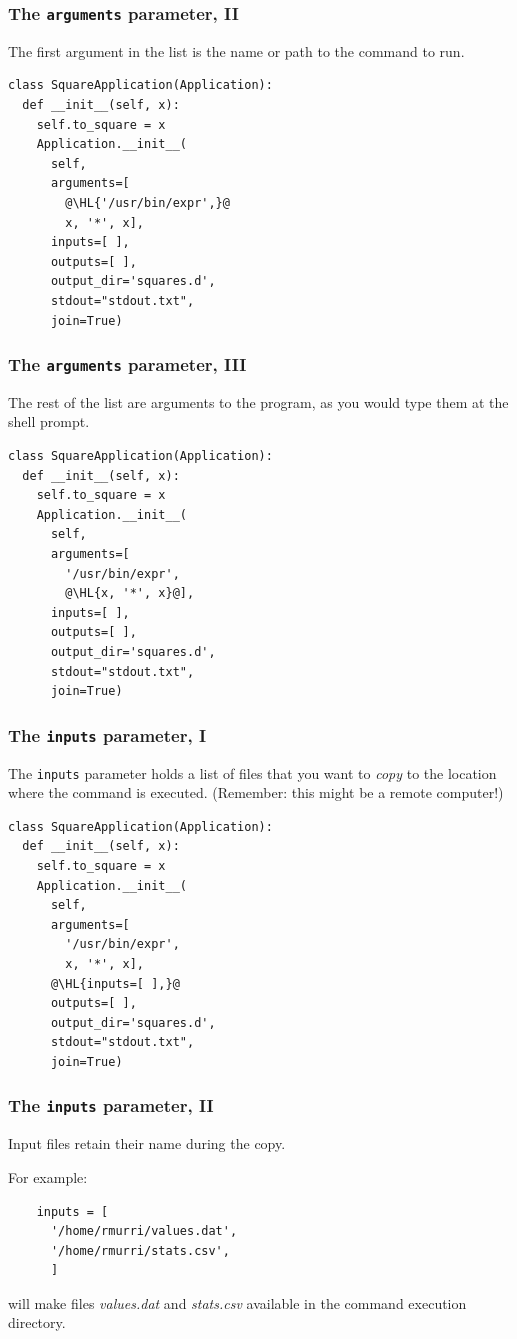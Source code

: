 \documentclass[english,serif,mathserif,xcolor=pdftex,dvipsnames,table]{beamer}
\begin{document}
\begin{frame}[fragile]
\frametitle{The \texttt{arguments} parameter, II}

The first argument in the list is the name or path to the command to run.

  \+
\begin{lstlisting}
class SquareApplication(Application):
  def __init__(self, x):
    self.to_square = x
    Application.__init__(
      self,
      arguments=[
        @\HL{'/usr/bin/expr',}@
        x, '*', x],
      inputs=[ ],
      outputs=[ ],
      output_dir='squares.d',
      stdout="stdout.txt",
      join=True)
\end{lstlisting}
\end{frame}

\begin{frame}[fragile]
\frametitle{The \texttt{arguments} parameter, III}

The rest of the list are arguments to the program, as you would type
them at the shell prompt.

  \+
\begin{lstlisting}
class SquareApplication(Application):
  def __init__(self, x):
    self.to_square = x
    Application.__init__(
      self,
      arguments=[
        '/usr/bin/expr',
        @\HL{x, '*', x}@],
      inputs=[ ],
      outputs=[ ],
      output_dir='squares.d',
      stdout="stdout.txt",
      join=True)
\end{lstlisting}
\end{frame}


\begin{frame}[fragile]
\frametitle{The \texttt{inputs} parameter, I}

The \texttt{inputs} parameter holds a list of files that you want to
\emph{copy} to the location where the command is executed. (Remember:
this might be a remote computer!)

  \+
\begin{lstlisting}
class SquareApplication(Application):
  def __init__(self, x):
    self.to_square = x
    Application.__init__(
      self,
      arguments=[
        '/usr/bin/expr',
        x, '*', x],
      @\HL{inputs=[ ],}@
      outputs=[ ],
      output_dir='squares.d',
      stdout="stdout.txt",
      join=True)
\end{lstlisting}
\end{frame}


\begin{frame}[fragile]
  \frametitle{The \texttt{inputs} parameter, II}

  Input files retain their name during the copy.

  \+
  For example:
  \begin{lstlisting}
    inputs = [
      '/home/rmurri/values.dat',
      '/home/rmurri/stats.csv',
      ]
  \end{lstlisting}
  will make files \emph{values.dat} and \emph{stats.csv} available in
  the command execution directory.

\end{frame}
\end{document}
